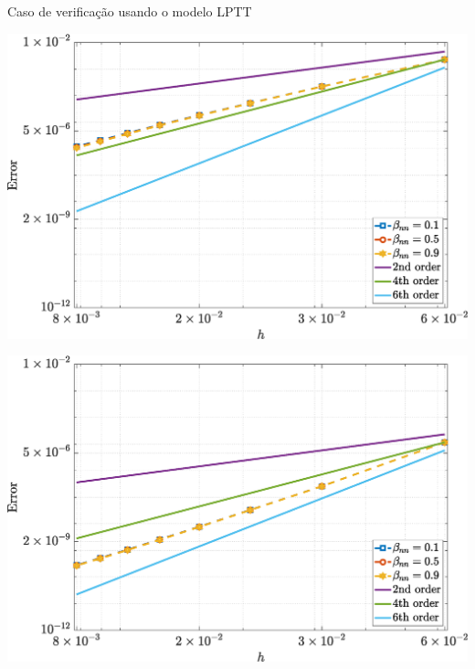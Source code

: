 \begin{frame}{Caso de verificação usando o modelo LPTT}
    \centering
    \captionsetup{justification=centering}
    \label{fig:lptt_2}
    \begin{minipage}{0.49\textwidth}
        \centering
        \includegraphics[width=\textwidth]{Figures/NormErr_2nd_Re_100_Wi_1_epsilon_0_xi_0_alphaG_0_Dt_1e-06_at_0.05_tipsim_1_MMS_12_Wz.eps}
        \label{lptt_wz_Case11}
    \end{minipage}
    \hfill
    \begin{minipage}{0.49\textwidth}
        \centering
        \includegraphics[width=\textwidth]{Figures/NormErr_2nd_Re_100_Wi_1_epsilon_0_xi_0_alphaG_0_Dt_1e-06_at_0.05_tipsim_1_MMS_12_Psi.eps}
        \label{lptt_psi_Case11}
    \end{minipage}
\end{frame}

